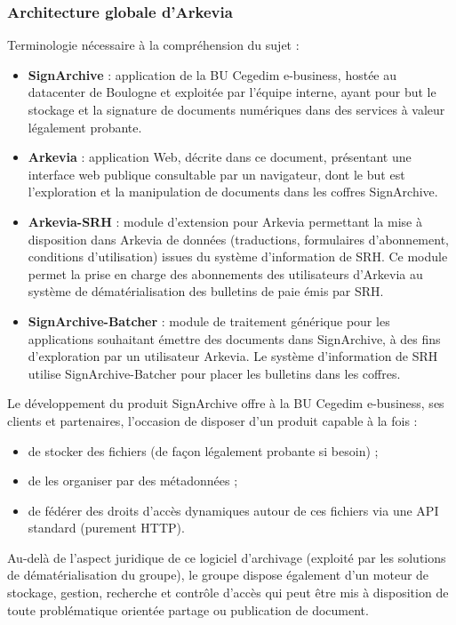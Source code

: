 \subsubsection{Architecture globale d'Arkevia}
Terminologie nécessaire à la compréhension du sujet :
\begin{beware}[title=Terminologie : ] 
   \begin{itemize}
       \item \textbf{SignArchive} : application de la BU Cegedim e-business, hostée au  datacenter de Boulogne et exploitée par l’équipe interne, ayant pour but le stockage et la signature de documents numériques dans des services à valeur légalement probante.
       \item \textbf{Arkevia} : application Web, décrite dans ce document, présentant une  interface web publique consultable par un navigateur, dont le but est l'exploration et la manipulation de documents dans les coffres SignArchive.
       \item \textbf{Arkevia-SRH} : module d'extension pour Arkevia permettant la mise à disposition dans Arkevia de données (traductions, formulaires d’abonnement, conditions  d'utilisation) issues du système d’information de SRH. Ce module permet la prise en charge des abonnements des utilisateurs d’Arkevia au système de dématérialisation des bulletins de paie émis par SRH.
       \item \textbf{SignArchive-Batcher} : module de traitement générique pour les   applications souhaitant émettre des documents dans SignArchive, à des fins d’exploration par un utilisateur Arkevia.  Le système d’information de SRH utilise SignArchive-Batcher pour placer les bulletins dans les coffres.
   \end{itemize}
\end{beware}
Le développement du produit SignArchive offre à la BU Cegedim e-business, ses clients et partenaires, l’occasion de disposer d’un produit capable à la fois :
\begin{itemize}
    \item de stocker des fichiers (de façon légalement probante si besoin) ;
    \item de les organiser par des métadonnées ;
    \item de fédérer des droits d’accès dynamiques autour de ces fichiers via une API standard (purement HTTP).
\end{itemize}
Au-delà de l’aspect juridique de ce logiciel d’archivage (exploité par les solutions de dématérialisation du groupe), le groupe dispose également d’un moteur de stockage, gestion, recherche et contrôle d'accès qui peut être mis à disposition de toute problématique orientée partage ou publication de document.\\

